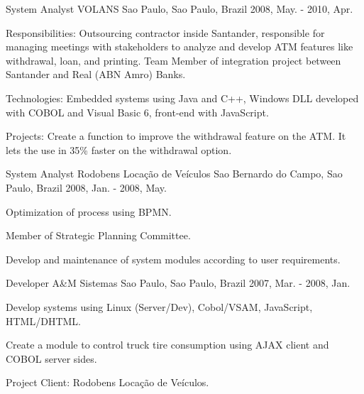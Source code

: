 \begin{cventries}
  \cventry
    {System Analyst} %
    {VOLANS} %
    {Sao Paulo, Sao Paulo, Brazil} %
    {2008, May. - 2010, Apr.} %
    {
          \begin{cvitems} %
            \item {Responsibilities: Outsourcing contractor inside Santander, responsible for managing meetings with stakeholders to analyze and develop ATM features like withdrawal, loan, and printing. Team Member of integration project between Santander and Real (ABN Amro) Banks.}
            \item {Technologies: Embedded systems using Java and C++, Windows DLL developed with COBOL and Visual Basic 6, front-end with JavaScript.}
            \item {Projects: Create a function to improve the withdrawal feature on the ATM. It lets the use in 35\% faster on the withdrawal option.}
          \end{cvitems}
    }

  \cventry
    {System Analyst} %
    {Rodobens Locação de Veículos} %
    {Sao Bernardo do Campo, Sao Paulo, Brazil} %
    {2008, Jan. - 2008, May.} %
    {
          \begin{cvitems} %
            \item {Optimization of process using BPMN.}
            \item {Member of Strategic Planning Committee.}
            \item {Develop and maintenance of system modules according to user requirements.}
          \end{cvitems}
    }

  \cventry
    {Developer} %
    {A\&M Sistemas} %
    {Sao Paulo, Sao Paulo, Brazil} %
    {2007, Mar. - 2008, Jan.} %
    {
          \begin{cvitems} %
            \item {Develop systems using Linux (Server/Dev), Cobol/VSAM, JavaScript, HTML/DHTML.}
            \item {Create a module to control truck tire consumption using AJAX client and COBOL server sides.}
            \item {Project Client: Rodobens Locação de Veículos.}
          \end{cvitems}
    }


\end{cventries}
